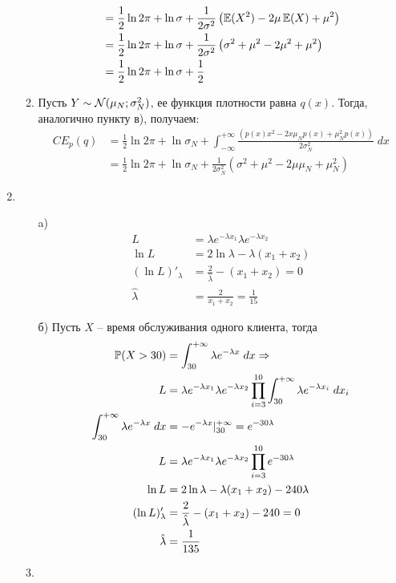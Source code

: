 \begin{enumerate}
\begin{enumerate}
\begin{align*}
&=\frac{1}{2}\ln 2\pi + \ln \sigma+\frac{1}{2\sigma^2}\left(\E(X^2)-2\mu\E(X)+\mu^2\right)\\
&=\frac{1}{2}\ln 2\pi + \ln \sigma+\frac{1}{2\sigma^2}\left(\sigma^2+\mu^2-2\mu^2+\mu^2\right)\\
&=\frac{1}{2}\ln 2\pi + \ln \sigma+\frac{1}{2}
\end{align*}
\item Пусть $Y \sim \cN(\mu_N;\sigma^2_N)$, ее функция плотности равна $q(x)$. Тогда, аналогично пункту в), получаем:
\begin{align*}
CE_p(q) &= \frac{1}{2}\ln 2\pi + \ln \sigma_N +\int^{+\infty}_{-\infty}\frac{\left(p(x)x^2-2x\mu_N p(x) + \mu^2_Np(x)\right)}{2\sigma^2_N} \; dx\\
&= \frac{1}{2}\ln 2\pi + \ln \sigma_N + \frac{1}{2\sigma^2_N}\left(\sigma^2 + \mu^2-2\mu\mu_N + \mu^2_N\right)
\end{align*}
\end{enumerate}
\item
\begin{enumerate}
\item[a)]
\begin{align*}
L&=\lambda e^{-\lambda x_1}\lambda e^{-\lambda x_2}\\
\ln L&=2\ln \lambda-\lambda(x_1+x_2)\\
(\ln L)'_\lambda&=\frac{2}{\hat{\lambda}}-(x_1+x_2)=0\\
\hat{\lambda}&=\frac{2}{x_1+x_2}=\frac{1}{15}
\end{align*}
\item[б)] Пусть $X$ – время обслуживания одного клиента, тогда
\begin{align*}
\P(X>30)&=\int^{+\infty}_{30}\lambda e^{-\lambda x} \; dx \Rightarrow\\
L&=\lambda e^{-\lambda x_1}\lambda e^{-\lambda x_2}\prod^{10}_{i=3}\int^{+\infty}_{30}\lambda e^{-\lambda x_i} \; dx_i\\
\int^{+\infty}_{30}\lambda e^{-\lambda x} \; dx&=-e^{-\lambda x}|^{+\infty}_{30}=e^{-30\lambda}\\
L&=\lambda e^{-\lambda x_1}\lambda e^{-\lambda x_2}\prod^{10}_{i=3}e^{-30\lambda}\\
\ln L&=2\ln \lambda-\lambda(x_1+x_2)-240\lambda\\
(\ln L)'_\lambda&=\frac{2}{\hat{\lambda}}-(x_1+x_2)-240=0\\
\hat{\lambda}&=\frac{1}{135}
\end{align*}
\item
\begin{align*}

\end{align*}
\end{enumerate}
\end{enumerate}
